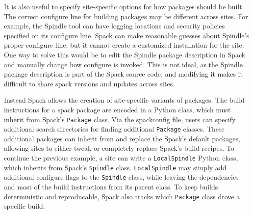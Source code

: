 It is also useful to specify site-specific options for how packages should be built.  The correct configure line for building packages may be different across sites.  For example, the Spindle tool can have logging locations and security policies specified on its configure line.  Spack can make reasonable guesses about Spindle's proper configure line, but it cannot create a customized installation for the site.  One way to solve this would be to edit the Spindle package description in Spack and manually change how configure is invoked.  This is not ideal, as the Spindle package description is part of the Spack source code, and modifying it makes it difficult to share spack versions and updates across sites.

Instead Spack allows the creation of site-specific variants of packages.  The build instructions for a spack package are encoded in a Python class, which must inherit from Spack's {\tt Package} class.  Via the spackconfig file, users can specify additional search directories for finding additional {\tt Package} classes.  These additional packages can inherit from and replace the Spack's default packages, allowing sites to either tweak or completely replace Spack's build recipes.  To continue the previous example, a site can write a {\tt LocalSpindle} Python class, which inherits from Spack's {\tt Spindle} class.  {\tt LocalSpindle} may simply add additional configure flags to the {\tt Spindle} class, while leaving the dependencies and most of the build instructions from its parent class.  To keep builds deterministic and reproducable, Spack also tracks which {\tt Package} class drove a specific build. 
